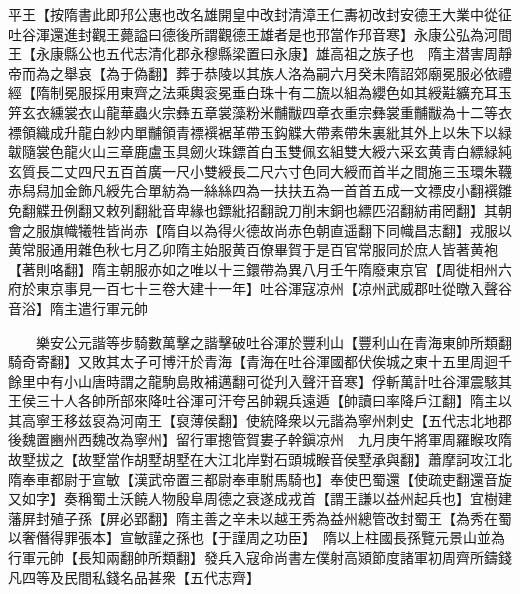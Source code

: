 平王【按隋書此即䢴公惠也改名雄開皇中改封清漳王仁夀初改封安德王大業中從征吐谷渾還進封觀王薨謚曰德後所謂觀德王雄者是也邘當作䢴音寒】永康公弘為河間王【永康縣公也五代志清化郡永穆縣梁置曰永康】雄高祖之族子也　隋主潜害周靜帝而為之舉哀【為于偽翻】葬于恭陵以其族人洛為嗣六月癸未隋詔郊廟冕服必依禮經【隋制冕服採用東齊之法乘輿衮冕垂白珠十有二旒以組為纓色如其綬黈纊充耳玉笄玄衣纁裳衣山龍華蟲火宗彝五章裳藻粉米黼黻四章衣重宗彝裳重黼黻為十二等衣褾領織成升龍白紗内單黼領青褾襈裾革帶玉鈎䚢大帶素帶朱裏紕其外上以朱下以緑韍隨裳色龍火山三章鹿盧玉具劒火珠鏢首白玉雙佩玄組雙大綬六采玄黄青白縹緑純玄質長二丈四尺五百首廣一尺小雙綬長二尺六寸色同大綬而首半之間施三玉環朱韈赤舄舄加金飾凡綬先合單紡為一絲絲四為一扶扶五為一首首五成一文褾皮小翻襈雛免翻䚢丑例翻又敕列翻紕音卑緣也鏢紕招翻說刀削末銅也縹匹沼翻紡甫罔翻】其朝會之服旗幟犧牲皆尚赤【隋自以為得火德故尚赤色朝直遥翻下同幟昌志翻】戎服以黄常服通用雜色秋七月乙卯隋主始服黄百僚畢賀于是百官常服同於庶人皆著黄袍【著則咯翻】隋主朝服亦如之唯以十三鐶帶為異八月壬午隋廢東京官【周徙相州六府於東京事見一百七十三卷大建十一年】吐谷渾寇凉州【凉州武威郡吐從暾入聲谷音浴】隋主遣行軍元帥

　　樂安公元諧等步騎數萬擊之諧擊破吐谷渾於豐利山【豐利山在青海東帥所類翻騎奇寄翻】又敗其太子可博汗於青海【青海在吐谷渾國都伏俟城之東十五里周迴千餘里中有小山唐時謂之龍駒島敗補邁翻可從刋入聲汗音寒】俘斬萬計吐谷渾震駭其王侯三十人各帥所部來降吐谷渾可汗夸呂帥親兵遠遁【帥讀曰率降戶江翻】隋主以其高寧王移兹裒為河南王【裒薄侯翻】使統降衆以元諧為寧州刺史【五代志北地郡後魏置豳州西魏改為寧州】留行軍摠管賀婁子幹鎭凉州　九月庚午將軍周羅睺攻隋故墅拔之【故墅當作胡墅胡墅在大江北岸對石頭城睺音侯墅承與翻】蕭摩訶攻江北　隋奉車都尉于宣敏【漢武帝置三都尉奉車駙馬騎也】奉使巴蜀還【使疏吏翻還音旋又如字】奏稱蜀土沃饒人物殷阜周德之衰遂成戎首【謂王謙以益州起兵也】宜樹建藩屏封殖子孫【屏必郢翻】隋主善之辛未以越王秀為益州總管改封蜀王【為秀在蜀以奢僭得罪張本】宣敏謹之孫也【于謹周之功臣】　隋以上柱國長孫覽元景山並為行軍元帥【長知兩翻帥所類翻】發兵入寇命尚書左僕射高熲節度諸軍初周齊所鑄錢凡四等及民間私錢名品甚衆【五代志齊】

